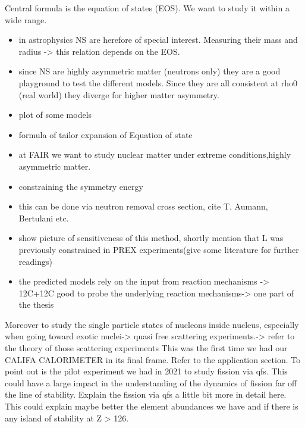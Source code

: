Central formula is the equation of states (EOS). We want to study it within a wide range. 
\begin{itemize}
\item in astrophysics NS are herefore of special interest. Measuring their mass and radius -> this relation depends on the EOS. 
\item since NS are highly asymmetric matter (neutrons only) they are a good playground to test the different models. Since they are all consistent at rho0 (real world) they diverge for higher matter asymmetry. 
\item plot of some models
\item formula of tailor expansion of Equation of state
\item at FAIR we want to study  nuclear matter under extreme conditions,highly asymmetric matter. 
\item constraining the symmetry energy
\item this can be done via neutron removal cross section, cite T. Aumann, Bertulani etc.
\item show picture of sensitiveness of this method, shortly mention that L was previously constrained in PREX experiments(give some literature for further readings)
\item the predicted models rely on the input from reaction mechanisms -> 12C+12C good to probe the underlying reaction mechanisms-> one part of the thesis
\end{itemize}
Moreover to study the single particle states of nucleons inside nucleus, especially when going toward exotic nuclei-> quasi free scattering experiments.-> refer to the theory of those scattering experiments
This was the first time we had our CALIFA CALORIMETER in its final frame. 
Refer to the application section. \newline
To point out is the pilot experiment we had in 2021 to study fission via qfs. This could have a large impact in the understanding of the dynamics of fission far off the line of stability. \newline
Explain the fission via qfs a little bit more in detail here.\newline
This could explain maybe better the element abundances we have and if there is any island of stability at Z > 126.

